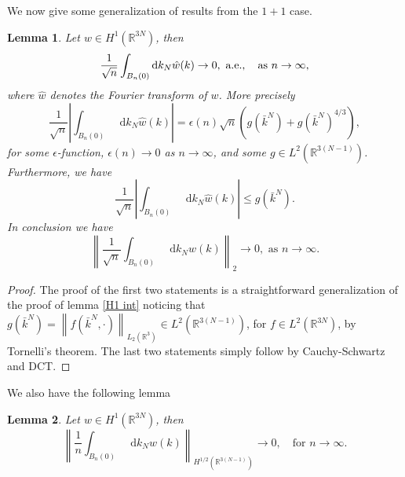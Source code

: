 \documentclass[a4paper,11pt]{article}
\newcommand{\norm}[1]{\left\lVert #1 \right\rVert}
\newcommand*\diff{\mathop{}\!\mathrm{d}}
\newcommand{\R}{\mathbb{R}}
\newtheorem{lemma}{Lemma}
\numberwithin{equation}{section}
\begin{document}
We now give some generalization of results from the $ 1+1 $ case.
\begin{lemma}\label{lemmawH1}
		Let $ w\in H^1(\R^{3N}) $, then \begin{equation}
		\frac{1}{\sqrt{n}}\int_{B_n(0)}\diff k_N\hat{w}(k)\to0,\textnormal{ a.e.},\quad \textnormal{as }n\to\infty,
		\end{equation}
		where $ \hat{w} $ denotes the Fourier transform of $ w $. More precisely \begin{equation}
		\frac{1}{\sqrt{n}}\left\lvert\int_{B_n(0)}\diff k_N\hat{w}(k)\right\rvert=\epsilon(n)\sqrt{n}\left(g(\bar{k}^N)+g(\bar{k}^N)^{4/3}\right),
		\end{equation}
		for some $ \epsilon $-function, $ \epsilon(n)\to0 $ as $ n\to\infty $, and some $ g\in L^{2}(\R^{3(N-1)}) $. Furthermore, we have 
		\begin{equation}
		\frac{1}{\sqrt{n}}\left\lvert\int_{B_n(0)}\diff k_N\hat{w}(k)\right\rvert\leq g(\bar{k}^N).
		\end{equation}
		In conclusion we have \begin{equation}
		\norm{\frac{1}{\sqrt{n}}\int_{B_n(0)}\diff k_N\hat{w}(k)}_2\to0,\text{ as }n\to\infty.
		\end{equation}
\end{lemma}
\begin{proof}
	The proof of the first two statements is a straightforward generalization of the proof of lemma \ref{H1 int} noticing that $ g(\bar{k}^N)=\norm{f(\bar{k}^N,\cdot)}_{L_2(\R^3)}\in L^2(\R^{3(N-1)}) $, for $ f\in L^2(\R^{3N}) $, by Tornelli's theorem. The last two statements simply follow by Cauchy-Schwartz and DCT. 
\end{proof}
We also have the following lemma \begin{lemma}\label{lemmawH1-2}
	Let $ w\in H^1(\R^{3N}) $, then
	\begin{equation}
		\norm{\frac{1}{n}\int_{B_n(0)}\diff k_N\hat{w}(k)}_{H^{1/2}(\R^{3(N-1)})}\to0,\quad\text{for }n\to\infty.
	\end{equation}
\end{lemma}
\end{document}
